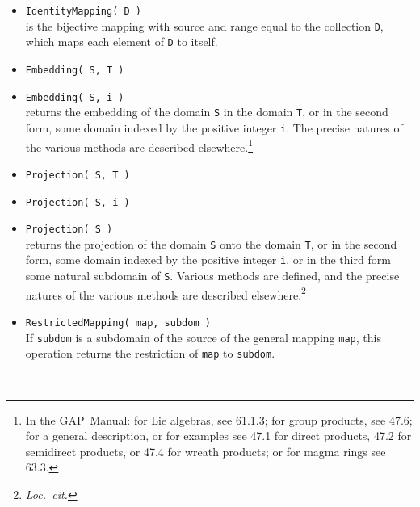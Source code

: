 \documentclass[11pt]{amsart}
\newcommand{\gap}{GAP}   %
\theoremstyle{plain}
\newcommand{\subsectionspace}{~\\[-6pt]}
\newcommand{\<}{\ensuremath{\langle}}
\renewcommand{\>}{\ensuremath{\rangle}}
\begin{document}
\begin{itemize}
\item {\tt IdentityMapping( D )}\\
is the bijective mapping with source and range equal to the collection {\tt D}, which
maps each element of {\tt D} to itself.
\item  {\tt Embedding( S, T )}
\item  {\tt Embedding( S, i )}\\
returns the embedding of the domain {\tt S} in the domain {\tt T}, or in the second form, some domain indexed by
the positive integer {\tt i}. The precise natures of the various methods are
described elsewhere.\footnote{In the \gap\ Manual: for Lie algebras, see 61.1.3; for
  group products, see 47.6; for a general description, or for examples see 47.1 for
  direct products, 47.2 for semidirect products, or 47.4 for wreath products; or for
  magma rings see 63.3.} 
\item  {\tt Projection( S, T )}
\item  {\tt Projection( S, i )}
\item  {\tt Projection( S )}\\
returns the projection of the domain {\tt S} onto the domain {\tt T}, or in the
second form, some domain indexed by the positive integer {\tt i}, or in the third
form some natural subdomain of {\tt S}.
Various methods are defined, and the precise natures of the various methods are
described elsewhere.\footnote{{\it Loc.~cit.}}
\item  {\tt RestrictedMapping( map, subdom )}\\
If {\tt subdom} is a subdomain of the source of the general mapping {\tt map}, this
operation returns the restriction of {\tt map} to {\tt subdom}.
\end{itemize}
\subsectionspace
\end{document}
